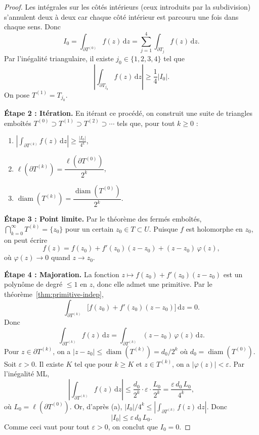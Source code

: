 \documentclass[12pt,a4paper,openany]{book}
\theoremstyle{definition}
\theoremstyle{plain}
\theoremstyle{remark}
\newcommand{\dd}{\mathrm{d}}
\newcommand{\abs}[1]{\left|#1\right|}
\begin{document}
\begin{proof}
Les intégrales sur les côtés intérieurs (ceux introduits par la subdivision)
s'annulent deux à deux car chaque côté intérieur est parcouru une fois dans
chaque sens. Donc
\[
  I_0 = \int_{\partial T^{(0)}} f(z)\,\dd z
  = \sum_{j=1}^{4} \int_{\partial T_j} f(z)\,\dd z.
\]
Par l'inégalité triangulaire, il existe $j_0 \in \{1,2,3,4\}$ tel que
\[
  \abs{\int_{\partial T_{j_0}} f(z)\,\dd z}
  \geq \frac{1}{4}\abs{I_0}.
\]
On pose $T^{(1)} = T_{j_0}$.

\medskip

\noindent\textbf{Étape 2 : Itération.}
En itérant ce procédé, on construit une suite de triangles emboîtés
$T^{(0)} \supset T^{(1)} \supset T^{(2)} \supset \cdots$ tels que, pour
tout $k \geq 0$ :
\begin{enumerate}[label=(\alph*)]
  \item $\displaystyle \abs{\int_{\partial T^{(k)}} f(z)\,\dd z}
    \geq \frac{\abs{I_0}}{4^k}$,
  \item $\ell(\partial T^{(k)}) = \dfrac{\ell(\partial T^{(0)})}{2^k}$,
  \item $\operatorname{diam}(T^{(k)}) = \dfrac{\operatorname{diam}(T^{(0)})}{2^k}$.
\end{enumerate}

\medskip

\noindent\textbf{Étape 3 : Point limite.}
Par le théorème des fermés emboîtés, $\displaystyle \bigcap_{k=0}^{\infty}
T^{(k)} = \{z_0\}$ pour un certain $z_0 \in T \subset U$. Puisque $f$ est
holomorphe en $z_0$, on peut écrire
\[
  f(z) = f(z_0) + f'(z_0)(z-z_0) + (z-z_0)\,\varphi(z),
\]
où $\varphi(z) \to 0$ quand $z \to z_0$.

\medskip

\noindent\textbf{Étape 4 : Majoration.}
La fonction $z \mapsto f(z_0) + f'(z_0)(z-z_0)$ est un polynôme de degré
$\leq 1$ en $z$, donc elle admet une primitive. Par le
théorème~\ref{thm:primitive-indep},
\[
  \int_{\partial T^{(k)}} \bigl[f(z_0) + f'(z_0)(z-z_0)\bigr]\,\dd z = 0.
\]
Donc
\[
  \int_{\partial T^{(k)}} f(z)\,\dd z
  = \int_{\partial T^{(k)}} (z-z_0)\,\varphi(z)\,\dd z.
\]
Pour $z \in \partial T^{(k)}$, on a $\abs{z - z_0} \leq
\operatorname{diam}(T^{(k)}) = d_0/2^k$ où $d_0 = \operatorname{diam}(T^{(0)})$.
Soit $\varepsilon > 0$. Il existe $K$ tel que pour $k \geq K$ et
$z \in T^{(k)}$, on a $\abs{\varphi(z)} < \varepsilon$. Par l'inégalité ML,
\[
  \abs{\int_{\partial T^{(k)}} f(z)\,\dd z}
  \leq \frac{d_0}{2^k} \cdot \varepsilon \cdot \frac{L_0}{2^k}
  = \frac{\varepsilon \, d_0 \, L_0}{4^k},
\]
où $L_0 = \ell(\partial T^{(0)})$. Or, d'après (a),
$\abs{I_0}/4^k \leq \abs{\int_{\partial T^{(k)}} f(z)\,\dd z}$. Donc
\[
  \abs{I_0} \leq \varepsilon \, d_0 \, L_0.
\]
Comme ceci vaut pour tout $\varepsilon > 0$, on conclut que $I_0 = 0$.
\end{proof}
\end{document}
